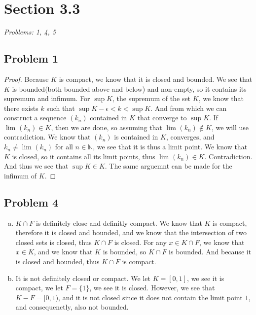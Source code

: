 \documentclass[12pt]{article}
\begin{document}

\section*{Section 3.3}
\textit{Problems: 1, 4, 5}
\subsection*{Problem 1}
\begin{proof}
    Because $K$ is compact, we know that it is closed and bounded. 
    We see that $K$ is bounded(both bounded above and below) and non-empty, so it contains its supremum and infimum. 
    For $\sup K$, the supremum of the set $K$, we know that there exists $k$ such that $\sup K - \epsilon < k < \sup K$. 
    And from which we can construct a sequence $(k_n)$ contained in $K$ that converge to $\sup K$.
    If $\lim_{}(k_n) \in K$, then we are done, so assuming that $\lim_{}(k_n) \notin K$, we will use contradiction.
    We know that $(k_n)$ is contained in $K$, converges, and $k_n \neq \lim_{}(k_n)$ for all $n \in \mathbb{N}$, we see that it is thus a limit point.
    We know that $K$ is closed, so it contains all its limit points, thus $\lim_{}(k_n) \in K$.
    Contradiction. 
    And thus we see that $\sup K \in K$. 
    The same arguemnt can be made for the infimum of $K$.
\end{proof}


\subsection*{Problem 4}
\begin{enumerate}[a).]
    \item {
        $K \cap F$ is definitely close and definitly compact. 
        We know that $K$ is compact, therefore it is closed and bounded, and we know that the intersection of two closed sets is closed, thus $K \cap F$ is closed.
        For any $x \in K \cap F$, we know that $x \in K$, and we know that $K$ is bounded, so $K \cap F$ is bounded. 
        And because it is closed and bounded, thus $K \cap F$ is compact.
    }
    \setcounter{enumi}{2}
    \item {
        It is not definitely closed or compact.
        We let $K = [0,1]$, we see it is compact, we let $F = \{1\}$, we see it is closed. 
        However, we see that $K - F = [0,1)$, and it is not closed since it does not contain the limit point $1$, and consequenctly, also not bounded. 
    }
\end{enumerate}
\end{document}
